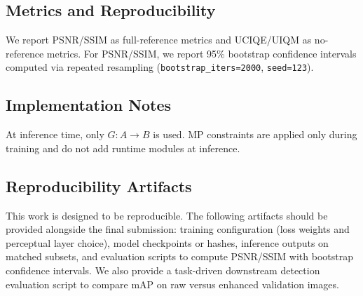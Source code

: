 \documentclass[11pt,a4paper]{article}
\begin{document}
\subsection{Metrics and Reproducibility}
We report PSNR/SSIM as full-reference metrics and UCIQE/UIQM as no-reference metrics. For PSNR/SSIM, we report 95\% bootstrap confidence intervals computed via repeated resampling (\texttt{bootstrap\_iters=2000}, \texttt{seed=123}).
\subsection{Implementation Notes}
At inference time, only $G: A\rightarrow B$ is used. MP constraints are applied only during training and do not add runtime modules at inference.
\subsection{Reproducibility Artifacts}
This work is designed to be reproducible. The following artifacts should be provided alongside the final submission: training configuration (loss weights and perceptual layer choice), model checkpoints or hashes, inference outputs on matched subsets, and evaluation scripts to compute PSNR/SSIM with bootstrap confidence intervals. We also provide a task-driven downstream detection evaluation script to compare mAP on raw versus enhanced validation images.
\end{document}
